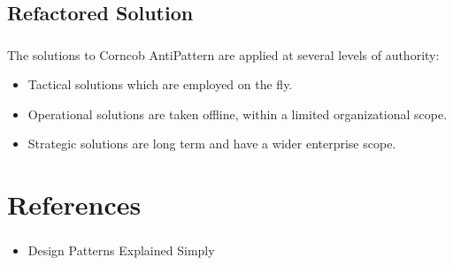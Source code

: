 \documentclass{beamer}
\begin{document}
\subsection{Refactored Solution}
\begin{frame}
\frametitle{}
The solutions to Corncob AntiPattern are applied at several levels of authority:
\begin{itemize}
\item Tactical solutions which are employed on the fly.
\item Operational solutions are taken offline, within a limited organizational scope.
\item Strategic solutions are long term and have a wider enterprise scope.
\end{itemize}
\end{frame}

\section{References}
\begin{frame}
\frametitle{}
\begin{itemize}
\item Design Patterns Explained Simply
\end{itemize}

\end{frame}
\end{document}
